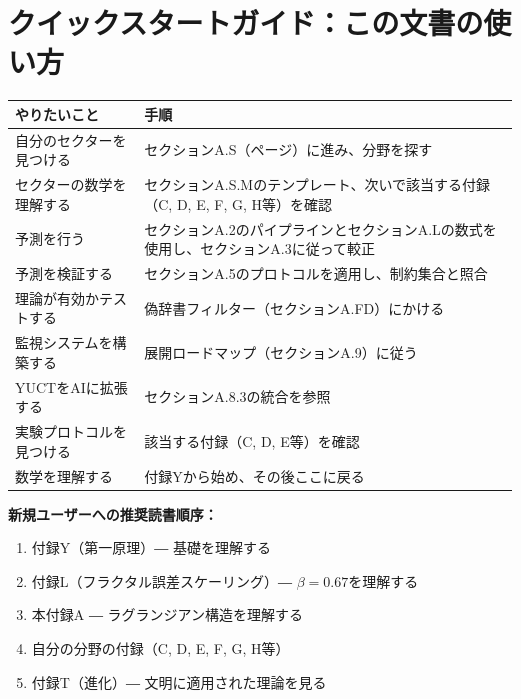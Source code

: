 \documentclass[13pt,a4paper]{ltjsarticle}
\begin{document}
	\section*{クイックスタートガイド：この文書の使い方}
	
	\begin{tabularx}{\textwidth}{|p{3.5cm}|X|}
		\hline
		\textbf{やりたいこと} & \textbf{手順} \\
		\hline
		自分のセクターを見つける & セクションA.S（\pageref{sec:sector-catalog}ページ）に進み、分野を探す \\
		\hline
		セクターの数学を理解する & セクションA.S.Mのテンプレート、次いで該当する付録（C, D, E, F, G, H等）を確認 \\
		\hline
		予測を行う & セクションA.2のパイプラインとセクションA.Lの数式を使用し、セクションA.3に従って較正 \\
		\hline
		予測を検証する & セクションA.5のプロトコルを適用し、制約集合と照合 \\
		\hline
		理論が有効かテストする & 偽辞書フィルター（セクションA.FD）にかける \\
		\hline
		監視システムを構築する & 展開ロードマップ（セクションA.9）に従う \\
		\hline
		YUCTをAIに拡張する & セクションA.8.3の統合を参照 \\
		\hline
		実験プロトコルを見つける & 該当する付録（C, D, E等）を確認 \\
		\hline
		数学を理解する & 付録Yから始め、その後ここに戻る \\
		\hline
	\end{tabularx}
	
	\vspace{0.5cm}
	\noindent\textbf{新規ユーザーへの推奨読書順序：}
	\begin{enumerate}
		\item 付録Y（第一原理）― 基礎を理解する
		\item 付録L（フラクタル誤差スケーリング）― $\beta = 0.67$を理解する
		\item 本付録A ― ラグランジアン構造を理解する
		\item 自分の分野の付録（C, D, E, F, G, H等）
		\item 付録T（進化）― 文明に適用された理論を見る
	\end{enumerate}
	
	
	\tableofcontents
	\newpage
	
\end{document}
